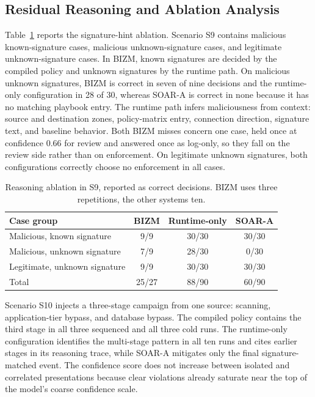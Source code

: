 \documentclass[final,5p]{elsarticle}
\begin{document}
\subsection{Residual Reasoning and Ablation Analysis}
\label{sec:reasoning_ablation}

Table~\ref{tab:reasoning} reports the signature-hint ablation. Scenario S9 contains malicious known-signature cases, malicious unknown-signature cases, and legitimate unknown-signature cases. In BIZM, known signatures are decided by the compiled policy and unknown signatures by the runtime path. On malicious unknown signatures, BIZM is correct in seven of nine decisions and the runtime-only configuration in 28 of 30, whereas SOAR-A is correct in none because it has no matching playbook entry. The runtime path infers maliciousness from context: source and destination zones, policy-matrix entry, connection direction, signature text, and baseline behavior. Both BIZM misses concern one case, held once at confidence 0.66 for review and answered once as log-only, so they fall on the review side rather than on enforcement. On legitimate unknown signatures, both configurations correctly choose no enforcement in all cases.

\begin{table}[tbp]
    \centering
    \caption{Reasoning ablation in S9, reported as correct decisions. BIZM uses three repetitions, the other systems ten.}
    \label{tab:reasoning}
    \small
    \setlength{\tabcolsep}{3.5pt}
    \begin{tabular}{@{}p{2.6cm}ccc@{}}
        \toprule
        \textbf{Case group} & \textbf{BIZM} & \textbf{Runtime-only} & \textbf{SOAR-A} \\
        \midrule
        Malicious, known signature    & 9/9   & 30/30 & 30/30 \\
        Malicious, unknown signature  & 7/9   & 28/30 & 0/30  \\
        Legitimate, unknown signature & 9/9   & 30/30 & 30/30 \\
        \midrule
        Total                         & 25/27 & 88/90 & 60/90 \\
        \bottomrule
    \end{tabular}
\end{table}

Scenario S10 injects a three-stage campaign from one source: scanning, application-tier bypass, and database bypass. The compiled policy contains the third stage in all three sequenced and all three cold runs. The runtime-only configuration identifies the multi-stage pattern in all ten runs and cites earlier stages in its reasoning trace, while SOAR-A mitigates only the final signature-matched event. The confidence score does not increase between isolated and correlated presentations because clear violations already saturate near the top of the model's coarse confidence scale.
\end{document}
